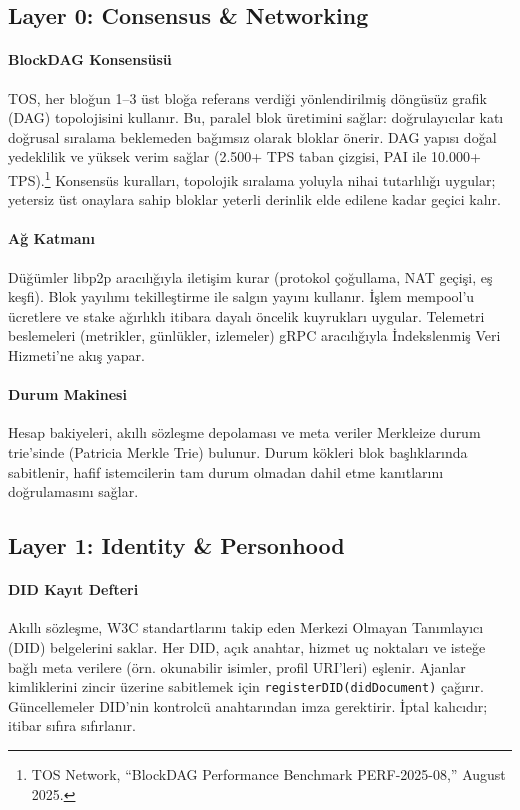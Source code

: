 \documentclass[11pt]{article}
\begin{document}
\subsection{Layer 0: Consensus \& Networking}
\paragraph{BlockDAG Konsensüsü} TOS, her bloğun 1--3 üst bloğa referans verdiği yönlendirilmiş döngüsüz grafik (DAG) topolojisini kullanır. Bu, paralel blok üretimini sağlar: doğrulayıcılar katı doğrusal sıralama beklemeden bağımsız olarak bloklar önerir. DAG yapısı doğal yedeklilik ve yüksek verim sağlar (2.500+ TPS taban çizgisi, PAI ile 10.000+ TPS).\footnote{TOS Network, ``BlockDAG Performance Benchmark PERF-2025-08,'' August 2025.} Konsensüs kuralları, topolojik sıralama yoluyla nihai tutarlılığı uygular; yetersiz üst onaylara sahip bloklar yeterli derinlik elde edilene kadar geçici kalır.

\paragraph{Ağ Katmanı} Düğümler libp2p aracılığıyla iletişim kurar (protokol çoğullama, NAT geçişi, eş keşfi). Blok yayılımı tekilleştirme ile salgın yayını kullanır. İşlem mempool'u ücretlere ve stake ağırlıklı itibara dayalı öncelik kuyrukları uygular. Telemetri beslemeleri (metrikler, günlükler, izlemeler) gRPC aracılığıyla İndekslenmiş Veri Hizmeti'ne akış yapar.

\paragraph{Durum Makinesi} Hesap bakiyeleri, akıllı sözleşme depolaması ve meta veriler Merkleize durum trie'sinde (Patricia Merkle Trie) bulunur. Durum kökleri blok başlıklarında sabitlenir, hafif istemcilerin tam durum olmadan dahil etme kanıtlarını doğrulamasını sağlar.

\subsection{Layer 1: Identity \& Personhood}
\paragraph{DID Kayıt Defteri} Akıllı sözleşme, W3C standartlarını takip eden Merkezi Olmayan Tanımlayıcı (DID) belgelerini saklar. Her DID, açık anahtar, hizmet uç noktaları ve isteğe bağlı meta verilere (örn. okunabilir isimler, profil URI'leri) eşlenir. Ajanlar kimliklerini zincir üzerine sabitlemek için \texttt{registerDID(didDocument)} çağırır. Güncellemeler DID'nin kontrolcü anahtarından imza gerektirir. İptal kalıcıdır; itibar sıfıra sıfırlanır.
\end{document}
